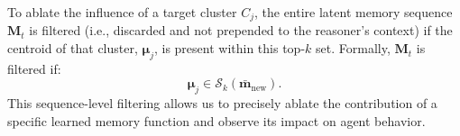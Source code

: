 \documentclass[]{fairmeta}
\begin{document}
To ablate the influence of a target cluster $C_j$, the entire latent memory sequence $\mathbf{M}_t$ is filtered (i.e., discarded and not prepended to the reasoner's context) if the centroid of that cluster, $\mathbf{\mu}_j$, is present within this top-$k$ set. Formally, $\mathbf{M}_t$ is filtered if:
\begin{equation}
\mathbf{\mu}_j \in \mathcal{S}_k(\bar{\mathbf{m}}_\text{new}).
\end{equation}
This sequence-level filtering allows us to precisely ablate the contribution of a specific learned memory function and observe its impact on agent behavior.



\end{document}
